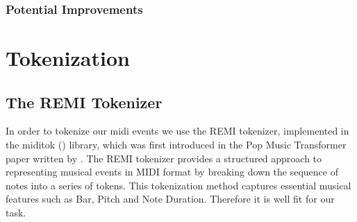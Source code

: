\documentclass[a4paper,12pt]{extarticle}
\begin{document}
\subsubsection{Potential Improvements}


\section{Tokenization}
\subsection{The REMI Tokenizer}
In order to tokenize our midi events we use the REMI tokenizer, implemented in the miditok (\cite{miditok2021}) library, which was first introduced in the Pop Music Transformer paper written by \cite{huang_remi_2020}. The REMI tokenizer provides a structured approach to representing musical events in MIDI format by breaking down the sequence of notes into a series of tokens. This tokenization method captures essential musical features such as Bar, Pitch and Note Duration. Therefore it is well fit for our task.
\end{document}
